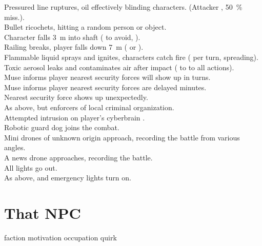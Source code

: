 \documentclass[a4]{article}
\begin{document}
\starttableone
Pressured line ruptures, oil effectively blinding characters. (Attacker , \SI{50}{\percent} miss.).\\
Bullet ricochets, hitting a random person or object.\\
Character falls \SI{3}{\m} into shaft ( to avoid,  ). \\
Railing breaks, player falls down \SI{7}{\m} ( or  ). \\
Flammable liquid sprays and ignites, characters catch fire ( per turn, spreading). \\
Toxic aerosol leaks and contaminates air after impact ( to  to all actions). \\
Muse informs player nearest security forces will show up in  turns.\\
Muse informs player nearest security forces are delayed  minutes.\\
Nearest security force shows up unexpectedly.\\
As above, but enforcers of local criminal organization.\\
Attempted intrusion on player's cyberbrain .\\
Robotic guard dog joins the combat.\\
Mini drones of unknown origin approach, recording the battle from various angles.\\
A news drone approaches, recording the battle.\\
All lights go out.\\
As above, and emergency lights turn on.\\

\stoptableone

\section{That NPC}

faction
motivation
occupation
quirk
\end{document}
